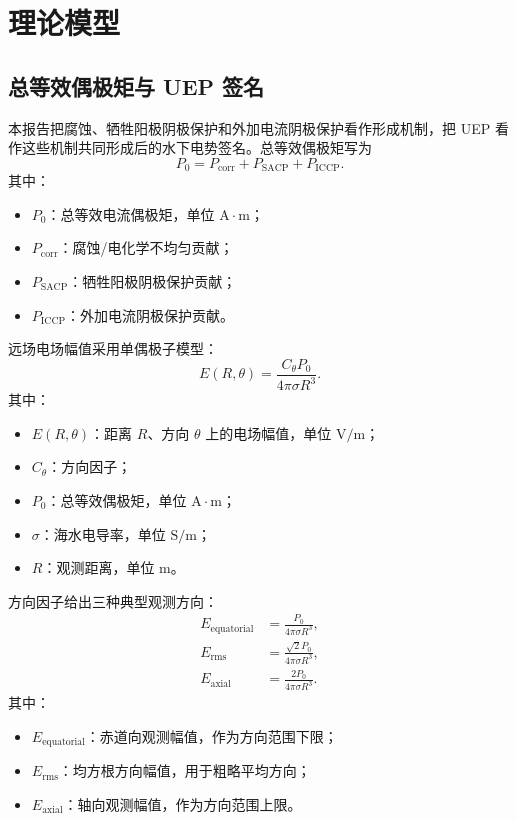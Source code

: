 \section{理论模型}

\subsection{总等效偶极矩与 UEP 签名}

本报告把腐蚀、牺牲阳极阴极保护和外加电流阴极保护看作形成机制，把 UEP 看作这些机制共同形成后的水下电势签名。总等效偶极矩写为
\begin{equation}
    P_0=P_{\mathrm{corr}}+P_{\mathrm{SACP}}+P_{\mathrm{ICCP}}.
    \label{eq:p0_components}
\end{equation}
其中：
\begin{itemize}
    \item $P_0$：总等效电流偶极矩，单位 $\mathrm{A\cdot m}$；
    \item $P_{\mathrm{corr}}$：腐蚀/电化学不均匀贡献；
    \item $P_{\mathrm{SACP}}$：牺牲阳极阴极保护贡献；
    \item $P_{\mathrm{ICCP}}$：外加电流阴极保护贡献。
\end{itemize}

远场电场幅值采用单偶极子模型：
\begin{equation}
    E(R,\theta)=\frac{C_\theta P_0}{4\pi\sigma R^3}.
    \label{eq:static_dipole}
\end{equation}
其中：
\begin{itemize}
    \item $E(R,\theta)$：距离 $R$、方向 $\theta$ 上的电场幅值，单位 $\mathrm{V/m}$；
    \item $C_\theta$：方向因子；
    \item $P_0$：总等效偶极矩，单位 $\mathrm{A\cdot m}$；
    \item $\sigma$：海水电导率，单位 $\mathrm{S/m}$；
    \item $R$：观测距离，单位 $\mathrm{m}$。
\end{itemize}

方向因子给出三种典型观测方向：
\begin{align}
    E_{\mathrm{equatorial}} &= \frac{P_0}{4\pi\sigma R^3},\\
    E_{\mathrm{rms}} &= \frac{\sqrt{2}P_0}{4\pi\sigma R^3},\\
    E_{\mathrm{axial}} &= \frac{2P_0}{4\pi\sigma R^3}.
\end{align}
其中：
\begin{itemize}
    \item $E_{\mathrm{equatorial}}$：赤道向观测幅值，作为方向范围下限；
    \item $E_{\mathrm{rms}}$：均方根方向幅值，用于粗略平均方向；
    \item $E_{\mathrm{axial}}$：轴向观测幅值，作为方向范围上限。
\end{itemize}

